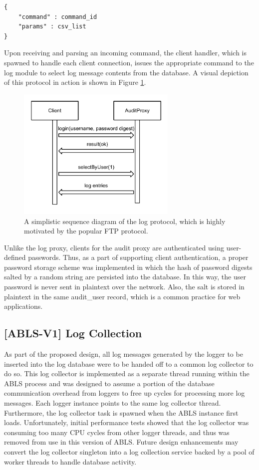 \documentclass{sig-alternate}
\begin{document}
\begin{lstlisting}
{     
    "command" : command_id
    "params" : csv_list
}
\end{lstlisting}

Upon receiving and parsing an incoming command, the client handler, which is spawned to handle each client connection,
issues the appropriate command to the log module to select log message contents from the database. 
A visual depiction of this protocol in action is shown in Figure \ref{fig:protocol}.

\begin{figure}[ht!]
\begin{center}
\includegraphics[width=3in]{images/logProtocol.pdf}
\caption{A simplistic sequence diagram of the log protocol, which is highly motivated by the popular FTP protocol.}
\label{fig:protocol}
\end{center}
\end{figure}

Unlike the log proxy, clients for the audit proxy are authenticated using user-defined passwords. Thus, as a
part of supporting client authentication, a proper password storage scheme was implemented in which the hash of 
password digests salted by a random string are persisted into the database. In this way, the user password is never sent 
in plaintext over the network. Also, the salt is stored in plaintext in the same audit\_user record, which is a common
practice for web applications.

\subsection{[ABLS-V1] Log Collection}
As part of the proposed design, all log messages generated by the logger to be inserted into the log
database were to be handed off to a common log collector to do so. This log collector is implemented as a 
separate thread running within the ABLS process and was designed to assume a portion of the database 
communication overhead from loggers to free up cycles for processing more log messages. Each logger instance
points to the same log collector thread. Furthermore, the log collector task is spawned when the ABLS 
instance first loads. Unfortunately, initial performance tests showed that the log collector was consuming too
many CPU cycles from other logger threads, and thus was removed from use in this version of ABLS. 
Future design enhancements may convert the log collector singleton into a log collection service backed 
by a pool of worker threads to handle database activity. 
\end{document}
